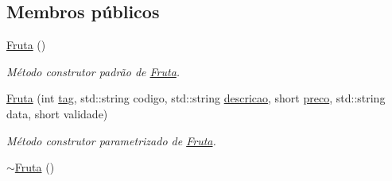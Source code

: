 \subsection*{Membros públicos}
\begin{DoxyCompactItemize}
\item 
\hypertarget{classFruta_ae1b52e5f60e121e940e9523e71b38e2d}{\hyperlink{classFruta_ae1b52e5f60e121e940e9523e71b38e2d}{Fruta} ()}\label{classFruta_ae1b52e5f60e121e940e9523e71b38e2d}

\begin{DoxyCompactList}\small\item\em Método construtor padrão de \hyperlink{classFruta}{Fruta}. \end{DoxyCompactList}\item 
\hyperlink{classFruta_aac6c8cb8aaf52d5da49d136f574f0fbc}{Fruta} (int \hyperlink{classProduto_a76711f92305c825f07549734cd7c6ade}{tag}, std\-::string codigo, std\-::string \hyperlink{classProduto_ab04a024e24feb7f79774e280356f6bc7}{descricao}, short \hyperlink{classProduto_a2ad13f91582fd70e878fc449c7b77171}{preco}, std\-::string data, short validade)
\begin{DoxyCompactList}\small\item\em Método construtor parametrizado de \hyperlink{classFruta}{Fruta}. \end{DoxyCompactList}\item 
\hypertarget{classFruta_a634920474b757127cb86443d402f84dd}{\hyperlink{classFruta_a634920474b757127cb86443d402f84dd}{$\sim$\-Fruta} ()}\label{classFruta_a634920474b757127cb86443d402f84dd}


\end{DoxyCompactItemize}
